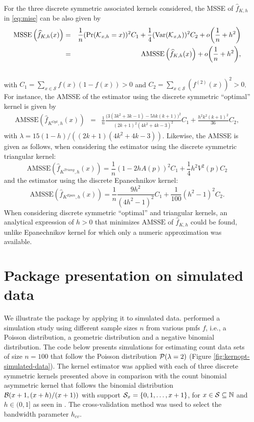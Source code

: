 For the three discrete symmetric associated kernels considered, the MSSE of \(\widehat{f}_{K,h}\) in \eqref{eq:mise} can be also given by
\begin{eqnarray*}\label{eq_2:mise}
\mathrm{MSSE}\left (\widehat{f}_{K,h}(x)\right )
&=&\frac{1}{n}(\Pr(\mathcal{K}_{x,h}=x))^{2}C_{1}+ \frac{1}{4}(\text{Var}(\mathcal{K}_{x,h}) )^{2}C_{2} + o\bigg(\frac{1}{n} + h^{2} \bigg)\\
&=&\mathrm{AMSSE}\left (\widehat{f}_{K,h}(x)\right ) + o\bigg(\frac{1}{n} + h^{2} \bigg),\notag
\end{eqnarray*}\\
with \(C_{1}=\sum_{x\in\mathcal{S}}f(x)(1-f(x))>0\) and \(C_{2}=\sum_{x\in\mathcal{S}}(f^{(2)}(x))^{2}>0\).
For instance, the AMSSE of the estimator using the discrete symmetric ``optimal'' kernel is given by
\begin{eqnarray*}\label{eq:amise_Kopt}
\mathrm{AMSSE}\left (\widehat{f}_{K^{Opt},h}(x)\right )
&=&\frac{1}{n}\frac{\big(3(3k^2+3k-1) - 5hk(k+1)\big)^{2}}{(2k+1)^{2}(4k^{2}+4k-3)^{2}}C_{1}+ \frac{h^{2}k^{2}(k+1)^{2}}{36}C_{2}, 
\end{eqnarray*}
with \(\lambda=15(1-h)/((2k+1)(4k^{2}+4k-3))\).
Likewise, the AMSSE is given as follows, when considering the estimator using the discrete symmetric triangular kernel:
\begin{equation*}\label{eq:amise_Ktriang}
\mathrm{AMSSE}\left (\widehat{f}_{K^{Triang},h}(x)\right )=\frac{1}{n}\left(1-2hA(p)\right)^{2}C_{1}+ \frac{1}{4}h^{2}V^{2}(p)C_{2}
\end{equation*}
and the estimator using the discrete Epanechnikov kernel:
\[\mathrm{AMSSE}\left (\widehat{f}_{K^{Epan},h}(x)\right )=\frac{1}{n}\frac{9h^{2}}{(4h^{2}-1)^{2}}C_{1}+ \frac{1}{100}(h^{2}-1)^{2}C_{2}.\]
When considering discrete symmetric ``optimal'' and triangular kernels, an analytical expression of \(h>0\) that minimizes \(\mathrm{AMSSE}\) of \(\widehat{f}_{K,h}\) could be found, unlike Epanechnikov kernel for which only a numeric approximation was available.

\section{Package presentation on simulated data}\label{sec4-presentation-simu}

We illustrate the  package by applying it to simulated data. \citet{SengaDurrieu2024} performed a simulation study using different sample sizes \(n\) from various pmfs \(f\), i.e., a Poisson distribution, a geometric distribution and a negative binomial distribution. The code below presents simulations for estimating count data sets of size \(n=100\) that follow the Poisson distribution \({\cal P} (\lambda=2)\) (Figure \ref{fig:kernopt-simulated-data}). The kernel estimator was applied with each of three discrete symmetric kernels presented above in comparison with the count binomial asymmetric kernel that follows the binomial distribution \({\cal B}(x+1,(x+h)/(x+1))\) with support \({\cal S}_x=\{0,1,\ldots,x+1\}\), for \(x \in {\cal S} \subseteq {\mathbb N}\) and \(h \in (0,1]\) as seen in \citet{KokonSenga11}. The cross-validation method was used to select the bandwidth parameter \(h_{cv}\).

